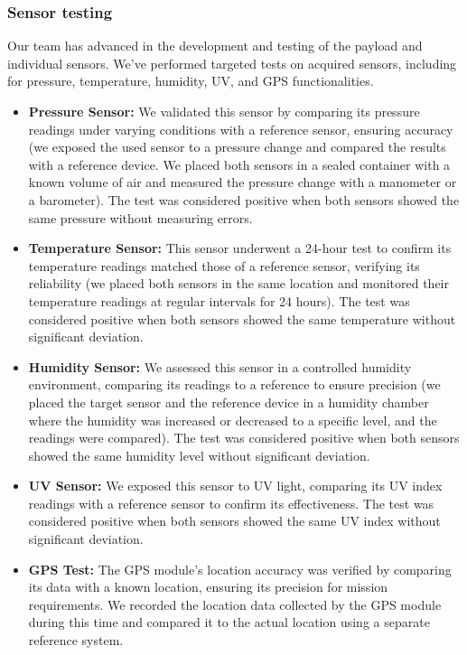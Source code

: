 \subsubsection*{Sensor testing}
Our team has advanced in the development and testing of the payload and individual sensors. We've performed targeted tests on acquired sensors, including for pressure, temperature, humidity, UV, and GPS functionalities.
\begin{itemize}
    \item \textbf{Pressure Sensor:} We validated this sensor by comparing its pressure readings under varying conditions with a reference sensor, ensuring accuracy (we exposed the used sensor to a pressure change and compared the results with a reference device. We placed both sensors in a sealed container with a known volume of air and measured the pressure change with a manometer or a barometer). The test was considered positive when both sensors showed the same pressure without measuring errors.

    \item \textbf{Temperature Sensor:} This sensor underwent a 24-hour test to confirm its temperature readings matched those of a reference sensor, verifying its reliability (we placed both sensors in the same location and monitored their temperature readings at regular intervals for 24 hours). The test was considered positive when both sensors showed the same temperature without significant deviation.

    \item \textbf{Humidity Sensor:} We assessed this sensor in a controlled humidity environment, comparing its readings to a reference to ensure precision (we placed the target sensor and the reference device in a humidity chamber where the humidity was increased or decreased to a specific level, and the readings were compared). The test was considered positive when both sensors showed the same humidity level without significant deviation.

    \item \textbf{UV Sensor:} We exposed this sensor to UV light, comparing its UV index readings with a reference sensor to confirm its effectiveness. The test was considered positive when both sensors showed the same UV index without significant deviation.

    \item \textbf{GPS Test:} The GPS module's location accuracy was verified by comparing its data with a known location, ensuring its precision for mission requirements. We recorded the location data collected by the GPS module during this time and compared it to the actual location using a separate reference system.  
\end{itemize}
